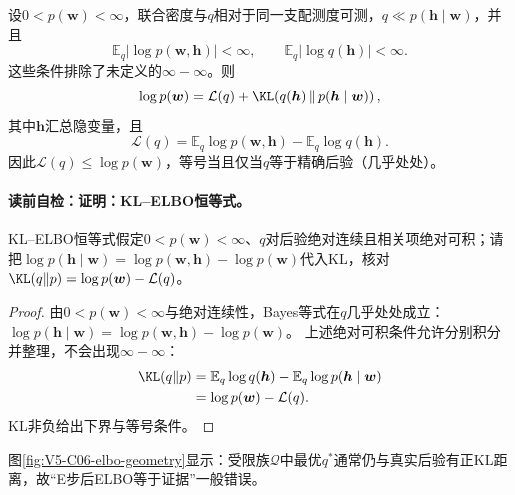 \begin{theorem}[KL--ELBO恒等式]\label{thm:V5-C06-elbo}
设$0<p(\boldsymbol w)<\infty$，联合密度与$q$相对于同一支配测度可测，$q\ll p(\boldsymbol h\mid\boldsymbol w)$，并且
\[
\mathbb E_q\!\left|\log p(\boldsymbol w,\boldsymbol h)\right|<\infty,
\qquad
\mathbb E_q\!\left|\log q(\boldsymbol h)\right|<\infty.
\]
这些条件排除了未定义的$\infty-\infty$。则
\begin{equation}
\log p(\boldsymbol w)
=\mathcal L(q)+
\KL\!\left(q(\boldsymbol h)\,
\middle\|\,p(\boldsymbol h\mid\boldsymbol w)\right),
\label{eq:V5-C06-elbo-identity}
\end{equation}
其中$\boldsymbol h$汇总隐变量，且
\[
\mathcal L(q)=
\mathbb E_q\log p(\boldsymbol w,\boldsymbol h)
-\mathbb E_q\log q(\boldsymbol h).
\]
因此$\mathcal L(q)\le\log p(\boldsymbol w)$，等号当且仅当$q$等于精确后验（几乎处处）。
\end{theorem}
\paragraph{读前自检：证明：KL--ELBO恒等式。}KL--ELBO恒等式假定$0<p(\boldsymbol w)<\infty$、$q$对后验绝对连续且相关项绝对可积；请把$\log p(\boldsymbol h\mid\boldsymbol w)=\log p(\boldsymbol w,\boldsymbol h)-\log p(\boldsymbol w)$代入KL，核对$\KL(q\|p)=\log p(\boldsymbol w)-\mathcal L(q)$。\par

\begin{proof}
由$0<p(\boldsymbol w)<\infty$与绝对连续性，Bayes等式在$q$几乎处处成立：
$\log p(\boldsymbol h\mid\boldsymbol w)
=\log p(\boldsymbol w,\boldsymbol h)-\log p(\boldsymbol w)$。
上述绝对可积条件允许分别积分并整理，不会出现$\infty-\infty$：
\begin{align*}
\KL(q\|p)
&=\mathbb E_q\log q(\boldsymbol h)
-\mathbb E_q\log p(\boldsymbol h\mid\boldsymbol w)\\
&=\log p(\boldsymbol w)-\mathcal L(q).
\end{align*}
KL非负给出下界与等号条件。
\end{proof}

图\ref{fig:V5-C06-elbo-geometry}显示：受限族$\mathcal Q$中最优$q^*$通常仍与真实后验有正KL距离，故“E步后ELBO等于证据”一般错误。


